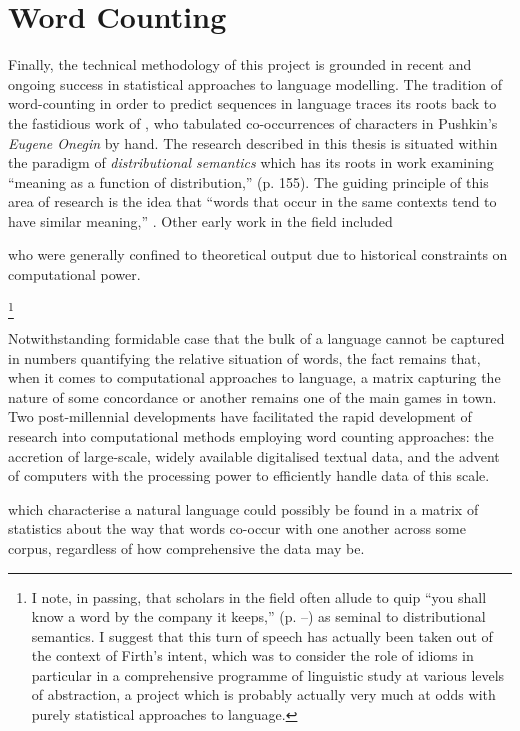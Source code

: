 \section{Word Counting}
Finally, the technical methodology of this project is grounded in recent and ongoing success in statistical approaches to language modelling.  The tradition of word-counting in order to predict sequences in language traces its roots back to the fastidious work of \cite{Markov}, who tabulated co-occurrences of characters in Pushkin's \emph{Eugene Onegin} by hand.  The research described in this thesis is situated within the paradigm of \emph{distributional semantics} which has its roots in  work examining ``meaning as a function of distribution,'' (p. 155).  The guiding principle of this area of research is the idea that ``words that occur in the same contexts tend to have similar meaning,'' \citep[][p. 126]{Pantel2005}.  Other early work in the field included 

who were generally confined to theoretical output due to historical constraints on computational power.

\footnote{I note, in passing, that scholars in the field often allude to  quip ``you shall know a word by the company it keeps,'' (p. --) as seminal to distributional semantics.  I suggest that this turn of speech has actually been taken out of the context of Firth's intent, which was to consider the role of idioms in particular in a comprehensive programme of linguistic study at various levels of abstraction, a project which is probably actually very much at odds with purely statistical approaches to language.}

Notwithstanding  formidable case that the bulk of a language cannot be captured in numbers quantifying the relative situation of words, the fact remains that, when it comes to computational approaches to language, a matrix capturing the nature of some concordance or another remains one of the main games in town.  Two post-millennial developments have facilitated the rapid development of research into computational methods employing word counting approaches: the accretion of large-scale, widely available digitalised textual data, and the advent of computers with the processing power to efficiently handle data of this scale.

which characterise a natural language could possibly be found in a matrix of statistics about the way that words co-occur with one another across some corpus, regardless of how comprehensive the data may be.

